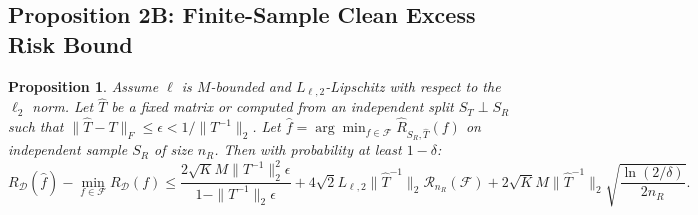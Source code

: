 \documentclass[11pt,onecolumn]{article}
\newtheorem{proposition}{Proposition}
\begin{document}
\subsection{Proposition 2B: Finite-Sample Clean Excess Risk Bound}
\begin{proposition}
Assume $\ell$ is $M$-bounded and $L_{\ell, 2}$-Lipschitz with respect to the $\ell_2$ norm. Let $\hat{T}$ be a fixed matrix or computed from an independent split $S_T \perp S_R$ such that $\|\hat{T} - T\|_F \le \epsilon < 1/\|T^{-1}\|_2$. Let $\hat{f} = \arg\min_{f \in \mathcal{F}} \hat{R}_{S_R, \hat{T}}(f)$ on independent sample $S_R$ of size $n_R$. Then with probability at least $1 - \delta$:
\begin{equation}
R_{\mathcal{D}}(\hat{f}) - \min_{f \in \mathcal{F}} R_{\mathcal{D}}(f) \le \frac{2 \sqrt{K} M \|T^{-1}\|_2^2 \epsilon}{1 - \|T^{-1}\|_2 \epsilon} + 4 \sqrt{2} L_{\ell, 2} \|\hat{T}^{-1}\|_2 \mathcal{R}_{n_R}(\mathcal{F}) + 2 \sqrt{K} M \|\hat{T}^{-1}\|_2 \sqrt{\frac{\ln(2/\delta)}{2 n_R}}.
\end{equation}
\end{proposition}
\end{document}
